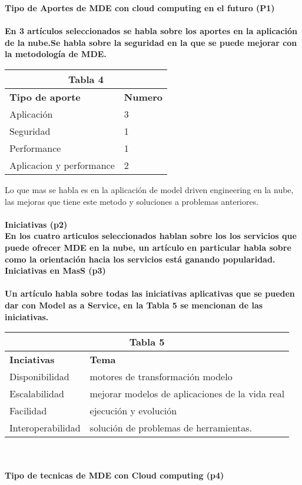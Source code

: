 \documentclass{llncs}
\begin{document}
\bf Tipo de Aportes de MDE con cloud computing en el futuro (P1) \\ \\
En 3 artículos seleccionados se habla sobre los aportes en la aplicación de la nube.Se habla sobre la seguridad en la que se puede mejorar con la metodología de MDE. 

\begin{tabular}{  | p{5cm} | p{3cm} |}
  \hline
  \multicolumn{2}{|c|}{\bf Tabla 4} \\
  \hline
  \bf Tipo de aporte  & \bf Numero \\
  \hline
  Aplicación & 3 \\
  \hline
  Seguridad & 1 \\
  \hline
   Performance & 1 \\
   \hline
   Aplicacion y performance & 2 \\
   \hline
\end{tabular}
\clearpage
Lo que mas se habla es en la aplicación de model driven engineering en la nube, las mejoras que tiene este metodo y soluciones a problemas anteriores. \\ \\ 
\bf Iniciativas (p2) \\
En los cuatro articulos seleccionados hablan sobre los los servicios que puede ofrecer MDE en la nube, un artículo en particular habla sobre como  la orientación hacia los servicios está ganando popularidad.
\\
\bf Iniciativas en MasS (p3) \\ \\
Un artículo habla sobre todas las iniciativas aplicativas que se pueden dar con Model as a Service, en la Tabla 5 se mencionan de las iniciativas.
\begin{tabular}{  | p{4cm} | p{7cm} |}
  \hline
  \multicolumn{2}{|c|}{\bf Tabla 5} \\
  \hline
  \bf Inciativas  & \bf Tema \\
  \hline
   Disponibilidad & motores de transformación modelo \\
  \hline
   Escalabilidad & mejorar modelos de aplicaciones de la vida real \\
  \hline
   Facilidad & ejecución y evolución \\
  \hline
   Interoperabilidad & solución de problemas de herramientas. \\
  \hline
\end{tabular} \\ \\
\bf Tipo de tecnicas de MDE con Cloud computing (p4)\\ \\
\end{document}
